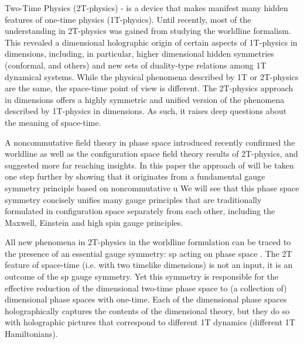 \documentclass[a4paper,12pt]{article}
\begin{document}
Two-Time Physics (2T-physics) \cite{survey2T}-\cite{NCSp} is a device that
makes manifest many hidden features of one-time physics (1T-physics). Until
recently, most of the understanding in 2T-physics was gained from studying
the worldline formalism. This revealed a \coordHE{} dimensional holographic
origin of certain aspects of 1T-physics in \coordHE{} dimensions, including, in
particular, higher dimensional hidden symmetries (conformal, and others) and
new sets of duality-type relations among 1T dynamical systems. While the
physical phenomena described by 1T or 2T-physics are the same, the
space-time point of view is different. The 2T-physics approach in \coordHE{}
dimensions offers a highly symmetric and unified version of the phenomena
described by 1T-physics in \coordHE{} dimensions. As such, it raises deep questions
about the meaning of space-time.

A noncommutative field theory in phase space introduced recently \cite{NCSp}
confirmed the worldline as well as the configuration space field theory \cite
{field2T} results of 2T-physics, and suggested more far reaching insights.
In this paper the approach of \cite{NCSp} will be taken one step further by
showing that it originates from a fundamental gauge symmetry principle based
on noncommutative u\coordHE{} We will see that this
phase space symmetry concisely unifies many gauge principles that are
traditionally formulated in configuration space separately from each other,
including the Maxwell, Einstein and high spin gauge principles.

All new phenomena in 2T-physics in the worldline formulation can be traced
to the presence of an essential gauge symmetry: sp\coordHE{}
acting on phase space \coordHE{} \cite{old2T}. The 2T
feature of space-time (i.e. \coordHE{} with two timelike dimensions) is not an
input, it is an outcome of the sp\coordHE{} gauge symmetry. Yet
this symmetry is responsible for the effective reduction of the \coordHE{}
dimensional two-time phase space to (a collection of) \coordHE{} dimensional phase
spaces with one-time. Each of the \coordHE{} dimensional phase spaces
holographically captures the contents of the \coordHE{} dimensional theory, but
they do so with holographic pictures that correspond to different 1T
dynamics (different 1T Hamiltonians).
\end{document}
